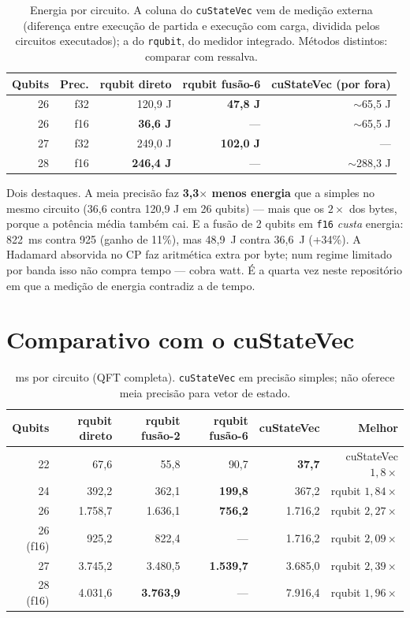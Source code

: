 \documentclass[11pt,a4paper]{article}
\begin{document}
\begin{table}[h]
\centering
\begin{tabular}{rrrrr}
\toprule
Qubits & Prec. & rqubit direto & rqubit fusão-6 & cuStateVec (por fora) \\
\midrule
26 & f32 & 120,9 J & \textbf{47,8 J} & $\sim$65,5 J \\
26 & f16 & \textbf{36,6 J} & --- & $\sim$65,5 J \\
27 & f32 & 249,0 J & \textbf{102,0 J} & --- \\
28 & f16 & \textbf{246,4 J} & --- & $\sim$288,3 J \\
\bottomrule
\end{tabular}
\caption{Energia por circuito. A coluna do \texttt{cuStateVec} vem de
medição externa (diferença entre execução de partida e execução com carga,
dividida pelos circuitos executados); a do \texttt{rqubit}, do medidor
integrado. Métodos distintos: comparar com ressalva.}
\end{table}

Dois destaques. A meia precisão faz \textbf{3,3$\times$ menos energia} que a
simples no mesmo circuito (36,6 contra 120,9 J em 26 qubits) --- mais que os
$2\times$ dos bytes, porque a potência média também cai. E a fusão de 2 qubits
em \texttt{f16} \emph{custa} energia: 822~ms contra 925 (ganho de 11\%), mas
48,9~J contra 36,6~J (+34\%). A Hadamard absorvida no CP faz aritmética extra
por byte; num regime limitado por banda isso não compra tempo --- cobra watt.
É a quarta vez neste repositório em que a medição de energia contradiz a de
tempo.

\section{Comparativo com o cuStateVec}

\begin{table}[h]
\centering
\begin{tabular}{rrrrrr}
\toprule
Qubits & rqubit direto & rqubit fusão-2 & rqubit fusão-6 & cuStateVec & Melhor \\
\midrule
22 & 67,6 & 55,8 & 90,7 & \textbf{37,7} & cuStateVec $1{,}8\times$ \\
24 & 392,2 & 362,1 & \textbf{199,8} & 367,2 & rqubit $1{,}84\times$ \\
26 & 1.758,7 & 1.636,1 & \textbf{756,2} & 1.716,2 & rqubit $2{,}27\times$ \\
26 (f16) & 925,2 & 822,4 & --- & 1.716,2 & rqubit $2{,}09\times$ \\
27 & 3.745,2 & 3.480,5 & \textbf{1.539,7} & 3.685,0 & rqubit $2{,}39\times$ \\
28 (f16) & 4.031,6 & \textbf{3.763,9} & --- & 7.916,4 & rqubit $1{,}96\times$ \\
\bottomrule
\end{tabular}
\caption{ms por circuito (QFT completa). \texttt{cuStateVec} em precisão
simples; não oferece meia precisão para vetor de estado.}
\end{table}
\end{document}
